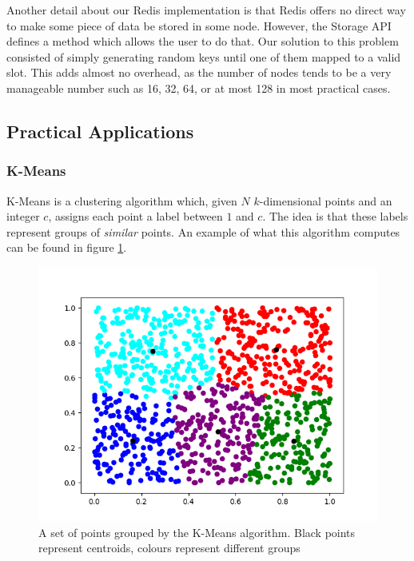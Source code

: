 Another detail about our Redis implementation is that Redis offers no direct way to make some piece of data be stored in some node. However, the Storage API defines a method which allows the user to do that. Our solution to this problem consisted of simply generating random keys until one of them mapped to a valid slot. This adds almost no overhead, as the number of nodes tends to be a very manageable number such as 16, 32, 64, or at most 128 in most practical cases.

\subsection{Practical Applications}
\label{subsec:storage_apps}
\subsubsection{K-Means}
\label{subsubsec:kmeans_redis}
K-Means \cite{Lloyd82leastsquares} is a clustering algorithm which, given $N$ $k$-dimensional points and an integer $c$, assigns each point a label between $1$ and $c$. The idea is that these labels represent groups of \textit{similar} points. An example of what this algorithm computes can be found in figure \ref{fig:kmeans_example}.

\begin{figure}
\centering
\includegraphics[scale = 0.5]{figures/kmeans_example.png}
\caption{A set of points grouped by the K-Means algorithm. Black points represent centroids, colours represent different groups}
\label{fig:kmeans_example}
\end{figure}


